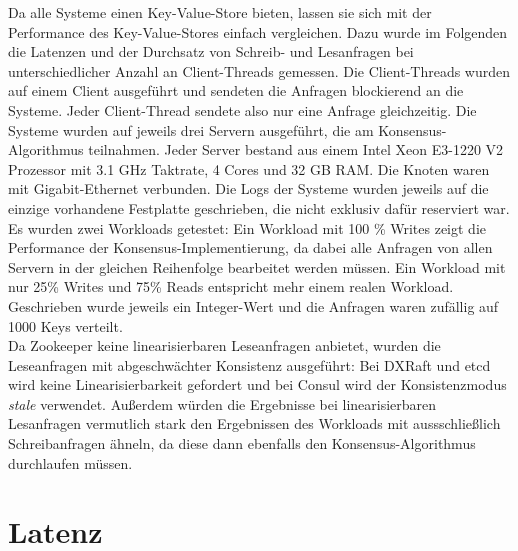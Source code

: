 Da alle Systeme einen Key-Value-Store bieten, lassen sie sich mit der Performance des Key-Value-Stores einfach vergleichen. Dazu wurde im Folgenden die Latenzen und der Durchsatz von Schreib- und Lesanfragen bei unterschiedlicher Anzahl an Client-Threads gemessen. Die Client-Threads wurden auf einem Client ausgeführt und sendeten die Anfragen blockierend an die Systeme. Jeder Client-Thread sendete also nur eine Anfrage gleichzeitig. Die Systeme wurden auf jeweils drei Servern ausgeführt, die am Konsensus-Algorithmus teilnahmen. Jeder Server bestand aus einem Intel Xeon E3-1220 V2 Prozessor mit 3.1 GHz Taktrate, 4 Cores und 32 GB RAM. Die Knoten waren mit Gigabit-Ethernet verbunden. Die Logs der Systeme wurden jeweils auf die einzige vorhandene Festplatte geschrieben, die nicht exklusiv dafür reserviert war. \\
Es wurden zwei Workloads getestet: Ein Workload mit 100 \% Writes zeigt die Performance der Konsensus-Implementierung, da dabei alle Anfragen von allen Servern in der gleichen Reihenfolge bearbeitet werden müssen. Ein Workload mit nur 25\% Writes und 75\% Reads entspricht mehr einem realen Workload. Geschrieben wurde jeweils ein Integer-Wert und die Anfragen waren zufällig auf 1000 Keys verteilt. \\
Da Zookeeper keine linearisierbaren Leseanfragen anbietet, wurden die Leseanfragen mit abgeschwächter Konsistenz ausgeführt: Bei DXRaft und etcd wird keine Linearisierbarkeit gefordert und bei Consul wird der Konsistenzmodus \textit{stale} verwendet. Außerdem würden die Ergebnisse bei linearisierbaren Lesanfragen vermutlich stark den Ergebnissen des Workloads mit aussschließlich Schreibanfragen ähneln, da diese dann ebenfalls den Konsensus-Algorithmus durchlaufen müssen.

\section{Latenz}
\label{latency}


